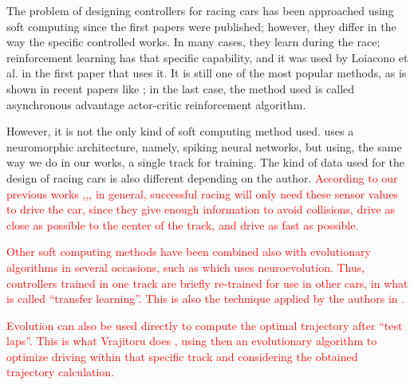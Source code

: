 \documentclass[10pt,journal,compsoc]{IEEEtran}
\begin{document}

The problem of designing controllers for racing cars has been
approached using soft computing since the first papers were
published; however, they differ in the way the specific controlled
works. In many cases, they learn during the race; reinforcement
learning has that specific capability, and it was used by Loiacono et
al. \cite{loiacono2010learning} in the first paper that uses it. It is still one of the most popular methods, as is shown
in recent papers like \cite{giani2019desing,remondaformula,waghdistributed}; in the last case, the method used is called asynchronous advantage actor-critic
reinforcement algorithm.

However, it is not the only kind of soft computing method
used. \cite{mirus2019short} uses a neuromorphic architecture, namely,
spiking neural networks, but using, the same way we do in our works, a single track for training. The kind of data used for the design of racing cars is
also different depending on the author. 
\textcolor{red}{
According to our previous works \cite{salem_evo17},\cite{salem_evo18},\cite{salem_cig2018}, in general, successful racing will only need these sensor values to drive the car, since they give enough information to avoid collisions, drive as close as possible to the center of the track, and drive as fast as possible.
}

\textcolor{red}{
Other soft computing methods have been combined also with evolutionary algorithms in several occasions, such as \cite{10.1371/journal.pone.0213193} which uses neuroevolution. Thus, controllers trained in one track are briefly re-trained for use in other cars, in what is called ``transfer learning''. This is also the technique applied by the authors in \cite{verma2018programmatically}. 
}

\textcolor{red}{
Evolution can also be used directly to compute the optimal trajectory after ``test laps''. This is what Vrajitoru does \cite{vrajitoru2019trajectory},
using then an evolutionary algorithm to optimize driving within that specific track and considering the obtained trajectory calculation. 
}
\end{document}
